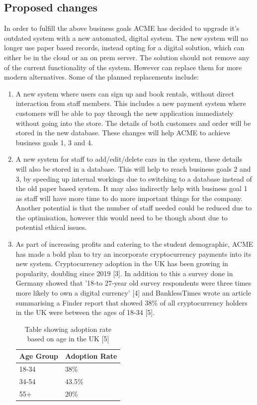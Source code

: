   \subsection{Proposed changes}
  In order to fulfill the above business goals ACME has decided to upgrade it's outdated system with a new automated, digital system. The new system will no 
  longer use paper based records, instead opting for a digital solution, which can either be in the cloud or an on prem server. The solution should not remove 
  any of the current functionality of the system. However can replace them for more modern alternatives. Some of the planned replacements include:
  \begin{enumerate}
    \item A new system where users can sign up and book rentals, without direct interaction from staff members. This includes a new payment system where
    customers will be able to pay through the new application immediately without going into the store. The details of both customers and order will be
    stored in the new database. These changes will help ACME to achieve business goals 1, 3 and 4.

    \item A new system for staff to add/edit/delete cars in the system, these details will also be stored in a database. This will help to reach business goals
    2 and 3, by speeding up internal workings due to switching to a database instead of the old paper based system. It may also indirectly help with business goal 1
    as staff will have more time to do more important things for the company. Another potential is that the number of staff needed could be reduced due to the 
    optimisation, however this would need to be though about due to potential ethical issues. 
    
    \item As part of increasing profits and catering to the student demographic, ACME has made a bold plan to try an incorporate cryptocurrency payments
    into its new system. Cryptocurrency adoption in the UK has been growing in popularity, doubling since 2019 [3]. In addition to this a survey done in Germany 
    showed that '18-to 27-year old survey respondents were three times more likely to own a digital currency' [4] and BanklessTimes wrote an article summarising
    a Finder report that showed 38\% of all cryptocurrency holders in the UK were between the ages of 18-34 [5].

    \begin{table}[H]
      \centering
      \begin{tabular}{|l|l|}
        \hline
        Age Group & Adoption Rate \\ \hline
        18-34     & 38\%          \\ \hline
        34-54     & 43.5\%        \\ \hline
        55+       & 20\%  \\ \hline     
      \end{tabular}
      \caption{Table showing adoption rate based on age in the UK [5]}
    \end{table}
  \end{enumerate}


